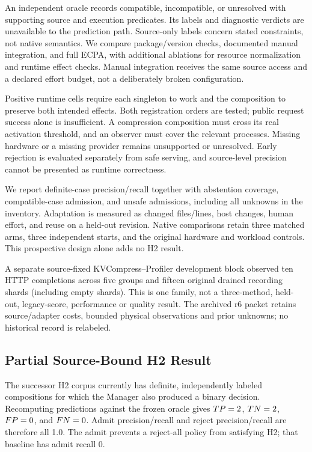 \documentclass[letterpaper,twocolumn,10pt]{article}
\begin{document}
An independent oracle records compatible, incompatible, or unresolved with
supporting source and execution predicates. Its labels and diagnostic verdicts
are unavailable to the prediction path. Source-only labels concern stated
constraints, not native semantics. We compare package/version checks,
documented manual integration, and full ECPA, with additional ablations for
resource normalization and runtime effect checks. Manual integration receives
the same source access and a declared effort budget, not a deliberately broken
configuration.

Positive runtime cells require each singleton to work and the composition to
preserve both intended effects. Both registration orders are tested; public
request success alone is insufficient. A compression composition must cross
its real activation threshold, and an observer must cover the relevant
processes. Missing hardware or a missing provider remains unsupported or
unresolved. Early rejection is evaluated separately from safe serving, and
source-level precision cannot be presented as runtime correctness.

We report definite-case precision/recall together with abstention coverage,
compatible-case admission, and unsafe admissions, including all unknowns in
the inventory. Adaptation is measured as changed files/lines, host changes,
human effort, and reuse on a held-out revision. Native comparisons retain
three matched arms, three independent starts, and the original hardware and
workload controls. This prospective design alone adds no H2 result.

A separate source-fixed KVCompress--Profiler development block observed ten
HTTP completions across five groups and fifteen original drained recording
shards (including empty shards). This is one family, not a three-method,
held-out, legacy-score, performance or quality result. The archived r6 packet
retains source/adapter costs, bounded physical observations and prior unknowns;
no historical record is relabeled.

\subsection{Partial Source-Bound H2 Result}
\label{sec:h2-partial}
The successor H2 corpus currently has \ECPAHTwoScoredCases{} definite,
independently labeled compositions for which the Manager also produced a
binary decision.  Recomputing predictions against the frozen oracle gives
$TP=2{}$, $TN=2{}$,
$FP=0{}$, and $FN=0{}$.  Admit
precision/recall and reject precision/recall are therefore all 1.0.  The admit
prevents a reject-all policy from satisfying H2; that baseline has admit recall
0.
\end{document}
